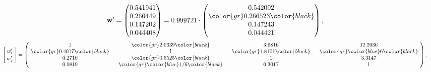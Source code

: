 \begin{example}
\begin{equation*}
\mathbf{w}^{\prime} =
\begin{pmatrix}
0.541941\\
0.266449\\
0.147202\\
0.044408
\end{pmatrix} =
0.999721\cdot
\begin{pmatrix}
0.542092\\
\color{gr} 0.266523\color{black} \\
0.147243\\
0.044421
\end{pmatrix},
\end{equation*}
\begin{equation*}
\left[ \frac{{w}^{\prime}_i}{{w}^{\prime}_j} \right] =
\begin{pmatrix}
$\,\,$ 1 $\,\,$ & $\,\,$\color{gr} 2.0339\color{black} $\,\,$ & $\,\,$3.6816$\,\,$ & $\,\,$12.2036$\,\,$ \\
$\,\,$\color{gr} 0.4917\color{black} $\,\,$ & $\,\,$ 1 $\,\,$ & $\,\,$\color{gr} 1.8101\color{black} $\,\,$ & $\,\,$\color{gr} \color{blue} 6\color{black}   $\,\,$ \\
$\,\,$0.2716$\,\,$ & $\,\,$\color{gr} 0.5525\color{black} $\,\,$ & $\,\,$ 1 $\,\,$ & $\,\,$3.3147 $\,\,$ \\
$\,\,$0.0819$\,\,$ & $\,\,$\color{gr} \color{blue}  1/6\color{black} $\,\,$ & $\,\,$0.3017$\,\,$ & $\,\,$ 1  $\,\,$ \\
\end{pmatrix},
\end{equation*}
\end{example}
\newpage
